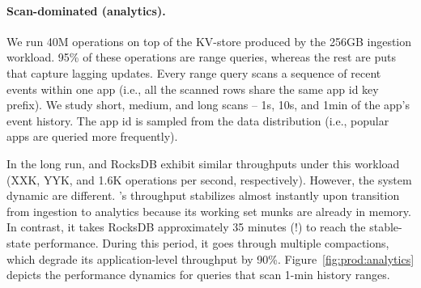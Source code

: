 {\paragraph{Scan-dominated (analytics).} We run 40M operations on top of the KV-store produced by the 256GB 
ingestion workload. 95\% of these operations are range queries, whereas the rest are puts that capture 
lagging updates. Every range query scans a sequence of recent events within one app (i.e., all the scanned rows 
share the same app id key prefix).  We study short, medium, and long scans -- 1s, 10s, and 1min of the app's 
event history. The app id is sampled from the data distribution (i.e., popular apps are queried more frequently).  

In the long run, \sys\/ and RocksDB exhibit similar throughputs under this workload (XXK, YYK, and 1.6K 
operations per second, respectively). However, the system dynamic are different. \sys's throughput stabilizes 
almost instantly upon transition from ingestion to analytics because its working set munks are already in memory. 
In contrast, it takes RocksDB approximately 35 minutes (!) to reach the stable-state performance. During this period, 
it goes through multiple compactions, which degrade its application-level throughput by 90\%. 
Figure~\ref{fig:prod:analytics} depicts the performance dynamics for queries that scan 1-min history ranges.}

